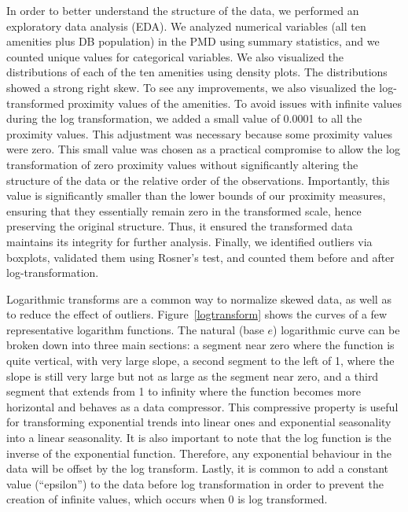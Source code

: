 \documentclass[11pt, a4paper]{article}
\begin{document}
In order to better understand the structure of the data, we performed an exploratory data analysis (EDA). We analyzed numerical variables (all ten amenities plus DB population) in the PMD using summary statistics, and we counted unique values for categorical variables. We also visualized the distributions of each of the ten amenities using density plots. The distributions showed a strong right skew. To see any improvements, we also visualized the log-transformed proximity values of the amenities. To avoid issues with infinite values during the log transformation, we added a small value of 0.0001 to all the proximity values. This adjustment was necessary because some proximity values were zero. This small value was chosen as a practical compromise to allow the log transformation of zero proximity values without significantly altering the structure of the data or the relative order of the observations. Importantly, this value is significantly smaller than the lower bounds of our proximity measures, ensuring that they essentially remain zero in the transformed scale, hence preserving the original structure. Thus, it ensured the transformed data maintains its integrity for further analysis.  Finally, we identified outliers via boxplots, validated them using Rosner’s test, and counted them before and after log-transformation.
\par
Logarithmic transforms are a common way to normalize skewed data, as well as to reduce the effect of outliers. Figure~\ref{logtransform} shows the curves of a few representative logarithm functions. The natural (base $e$) logarithmic curve can be broken down into three main sections: a segment near zero where the function is quite vertical, with very large slope, a second segment to the left of 1, where the slope is still very large but not as large as the segment near zero, and a third segment that extends from 1 to infinity where the function becomes more horizontal and behaves as a data compressor. This compressive property is useful for transforming exponential trends into linear ones and exponential seasonality into a linear seasonality. It is also important to note that the log function is the inverse of the exponential function. Therefore, any exponential behaviour in the data will be offset by the log transform. Lastly, it is common to add a constant value (``epsilon'') to the data before log transformation in order to prevent the creation of infinite values, which occurs when 0 is log transformed.
\end{document}
